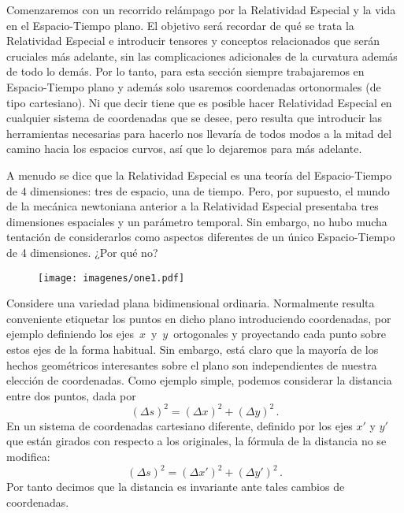 \documentclass[11pt,b5paper,openany,twoside]{book}
\begin{document}
Comenzaremos con un recorrido relámpago por la Relatividad Especial y la vida en el Espacio-Tiempo plano.
El objetivo será recordar de qué se trata la Relatividad Especial e introducir tensores y conceptos relacionados que serán cruciales más adelante, sin las complicaciones adicionales de la curvatura además de todo lo demás.
Por lo tanto, para esta sección siempre trabajaremos en Espacio-Tiempo plano y además solo usaremos coordenadas ortonormales (de tipo cartesiano).
Ni que decir tiene que es posible hacer Relatividad Especial en cualquier sistema de coordenadas que se desee, pero resulta que introducir las herramientas necesarias para hacerlo nos llevaría de todos modos a la mitad del camino hacia los espacios curvos, así que lo dejaremos para más adelante.

A menudo se dice que la Relatividad Especial es una teoría del Espacio-Tiempo de 4 dimensiones: tres de espacio, una de tiempo.
Pero, por supuesto, el mundo de la mecánica newtoniana anterior a la Relatividad Especial presentaba tres dimensiones espaciales y un parámetro temporal.
Sin embargo, no hubo mucha tentación de considerarlos como aspectos diferentes de un único Espacio-Tiempo de 4 dimensiones.
¿Por qué no?

\begin{figure}[h]
\centering
\texttt{[image: imagenes/one1.pdf]}
\end{figure}

Considere una variedad plana bidimensional ordinaria.
Normalmente resulta conveniente etiquetar los puntos en dicho plano introduciendo coordenadas, por ejemplo definiendo los ejes $\,x\,$ y $\,y\,$ ortogonales y proyectando cada punto sobre estos ejes de la forma habitual.
Sin embargo, está claro que la mayoría de los hechos geométricos interesantes sobre el plano son independientes de nuestra elección de coordenadas.
Como ejemplo simple, podemos considerar la distancia entre dos puntos, dada por
\begin{equation}
(\Delta s)^2 = (\Delta x)^2 + (\Delta y)^2\,.\label{1.1}
\end{equation}
En un sistema de coordenadas cartesiano diferente, definido por los ejes $x'$ y $y'$ que están girados con respecto a los originales, la fórmula de la distancia no se modifica:
\begin{equation}
(\Delta s)^2 = (\Delta x')^2 + (\Delta y')^2\,.\label{1.2}
\end{equation}
Por tanto decimos que la distancia es invariante ante tales cambios de coordenadas.
\end{document}
